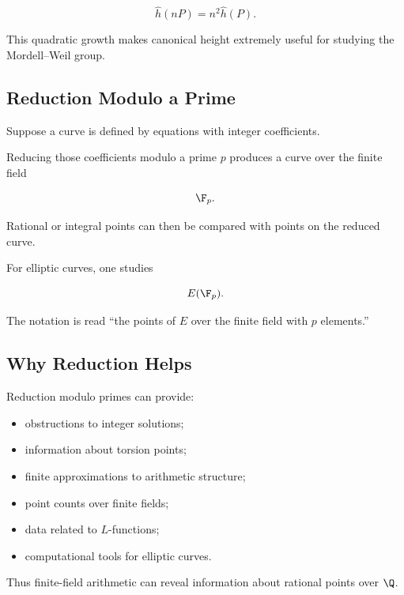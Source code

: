 \[ \boxed{\hat h(nP)=n^2\hat h(P).} \]

This quadratic growth makes canonical height extremely useful for studying
the Mordell--Weil group.

\subsection{Reduction Modulo a Prime}
\label{subsec:reduction-mod-p-curves}

Suppose a curve is defined by equations with integer coefficients.

Reducing those coefficients modulo a prime \(p\) produces a curve over the
finite field

\[ \F_p. \]

Rational or integral points can then be compared with points on the reduced
curve.

For elliptic curves, one studies

\[ E(\F_p). \]

The notation is read ``the points of \(E\) over the finite field with
\(p\) elements.''

\subsection{Why Reduction Helps}
\label{subsec:why-reduction-helps}

Reduction modulo primes can provide:

\begin{itemize}
    \item obstructions to integer solutions;
    \item information about torsion points;
    \item finite approximations to arithmetic structure;
    \item point counts over finite fields;
    \item data related to \(L\)-functions;
    \item computational tools for elliptic curves.
\end{itemize}

Thus finite-field arithmetic can reveal information about rational points
over \(\Q\).

